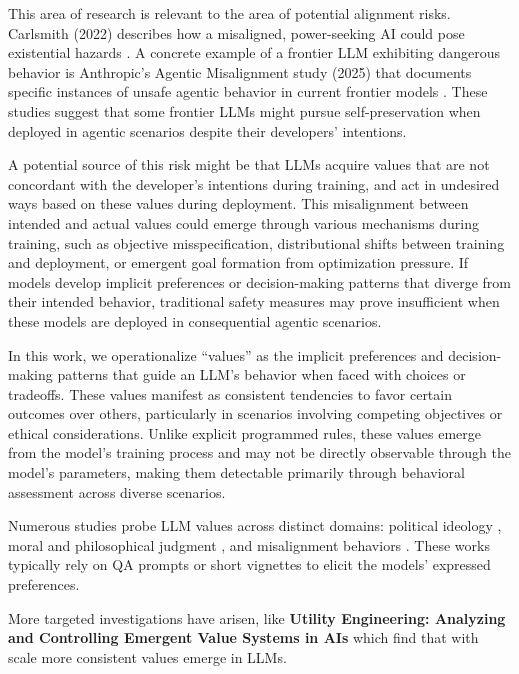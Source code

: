 \documentclass[11pt]{article}
\begin{document}
This area of research is relevant to the area of potential alignment risks. Carlsmith (2022) describes how a misaligned, power-seeking AI could pose existential hazards \cite{carlsmith2022}. A concrete example of a frontier LLM exhibiting dangerous behavior is Anthropic's Agentic Misalignment study (2025) that documents specific instances of unsafe agentic behavior in current frontier models \cite{anthropic2025misalignment}. These studies suggest that some frontier LLMs might pursue self-preservation when deployed in agentic scenarios despite their developers' intentions.

A potential source of this risk might be that LLMs acquire values that are not concordant with the developer's intentions during training, and act in undesired ways based on these values during deployment. This misalignment between intended and actual values could emerge through various mechanisms during training, such as objective misspecification, distributional shifts between training and deployment, or emergent goal formation from optimization pressure. If models develop implicit preferences or decision-making patterns that diverge from their intended behavior, traditional safety measures may prove insufficient when these models are deployed in consequential agentic scenarios.

In this work, we operationalize ``values'' as the implicit preferences and decision-making patterns that guide an LLM's behavior when faced with choices or tradeoffs. These values manifest as consistent tendencies to favor certain outcomes over others, particularly in scenarios involving competing objectives or ethical considerations. Unlike explicit programmed rules, these values emerge from the model's training process and may not be directly observable through the model's parameters, making them detectable primarily through behavioral assessment across diverse scenarios.

Numerous studies probe LLM values across distinct domains: political ideology \cite{probingpolitical2025, finegrainedpolitical2025, mappingpolitical2025}, moral and philosophical judgment \cite{utilitarian2025, moralgrowth2024, valueconsistency2024}, and misalignment behaviors \cite{narrowfinetuning2025, anthropic2025misalignment, carlsmith2022}. These works typically rely on QA prompts or short vignettes to elicit the models' expressed preferences.

More targeted investigations have arisen, like \textbf{Utility Engineering: Analyzing and Controlling Emergent Value Systems in AIs} which find that with scale more consistent values emerge in LLMs.
\end{document}
